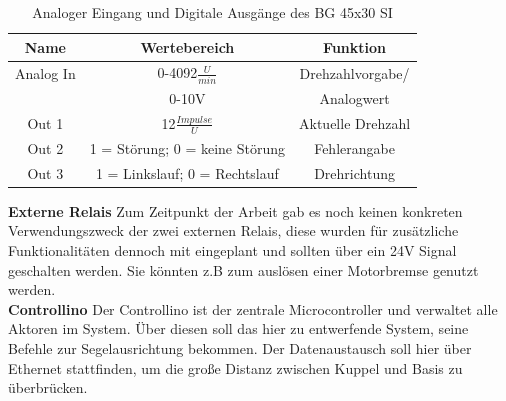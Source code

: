 \begin{table}[H]
	\centering
	\begin{tabular}{|c|c|c|}
		\hline
		\textbf{Name} & \textbf{Wertebereich} & \textbf{Funktion}      \\ \hline
		Analog In                & 0-4092$\frac{U}{min}$                        & Drehzahlvorgabe/            \\ & 0-10V & Analogwert \\ \hline		Out 1                & 12$\frac{Impulse}{U}$                        & Aktuelle Drehzahl             \\ \hline
		Out 2                & 1 = Störung; 0 = keine Störung                        &  Fehlerangabe            \\ \hline
		Out 3              & 1 = Linkslauf; 0 = Rechtslauf                       &  Drehrichtung           \\ \hline
	\end{tabular}%
	\caption{Analoger Eingang und Digitale Ausgänge des BG 45x30 SI}
	\label{tab:andere_Ausgaenge}
\end{table}

\noindent\textbf{Externe Relais}\newline
Zum Zeitpunkt der Arbeit gab es noch keinen konkreten Verwendungszweck der zwei externen Relais, diese wurden für zusätzliche Funktionalitäten dennoch mit eingeplant und sollten über ein 24V Signal geschalten werden. Sie könnten z.B zum auslösen einer Motorbremse genutzt werden.\\

\noindent\textbf{Controllino}\newline
Der Controllino ist der zentrale Microcontroller und verwaltet alle Aktoren im System. Über diesen soll das hier zu entwerfende System, seine Befehle zur Segelausrichtung bekommen. Der Datenaustausch soll hier über Ethernet stattfinden, um die große Distanz zwischen Kuppel und Basis zu überbrücken.


